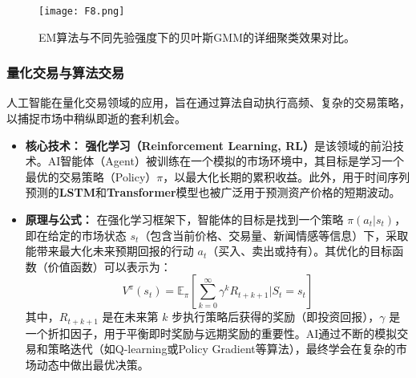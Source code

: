 \begin{itemize}
    \begin{figure}[htbp]
        \centering
        \texttt{[image: F8.png]}
        \caption{EM算法与不同先验强度下的贝叶斯GMM的详细聚类效果对比。}
        \label{fig:gmm_dirichlet_process_detailed}
    \end{figure}
    
    \subsubsection{量化交易与算法交易}
    人工智能在量化交易领域的应用，旨在通过算法自动执行高频、复杂的交易策略，以捕捉市场中稍纵即逝的套利机会。
    \begin{itemize}
        \item \textbf{核心技术：} \textbf{强化学习（Reinforcement Learning, RL）}是该领域的前沿技术。AI智能体（Agent）被训练在一个模拟的市场环境中，其目标是学习一个最优的交易策略（Policy）$\pi$，以最大化长期的累积收益。此外，用于时间序列预测的\textbf{LSTM}和\textbf{Transformer}模型也被广泛用于预测资产价格的短期波动。

        \item \textbf{原理与公式：} 在强化学习框架下，智能体的目标是找到一个策略 $\pi(a_t | s_t)$，即在给定的市场状态 $s_t$（包含当前价格、交易量、新闻情感等信息）下，采取能带来最大化未来预期回报的行动 $a_t$（买入、卖出或持有）。其优化的目标函数（价值函数）可以表示为：
        $$
        V^\pi(s_t) = \mathbb{E}_\pi \left[ \sum_{k=0}^{\infty} \gamma^k R_{t+k+1} | S_t=s_t \right]
        $$
        其中，$R_{t+k+1}$ 是在未来第 $k$ 步执行策略后获得的奖励（即投资回报），$\gamma$ 是一个折扣因子，用于平衡即时奖励与远期奖励的重要性。AI通过不断的模拟交易和策略迭代（如Q-learning或Policy Gradient等算法），最终学会在复杂的市场动态中做出最优决策。
    \end{itemize}
    

\end{itemize}
